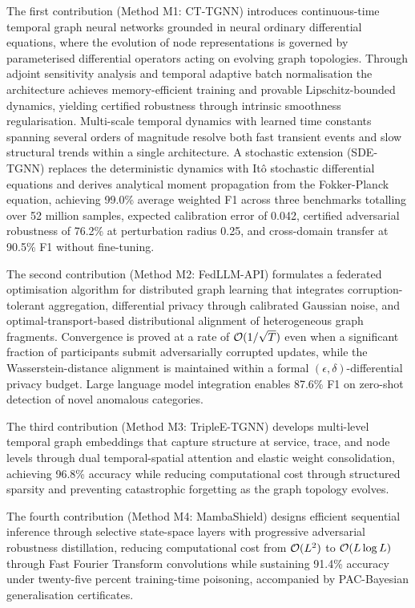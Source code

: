 The first contribution (Method M1: CT-TGNN) introduces continuous-time temporal graph neural networks grounded in neural ordinary differential equations, where the evolution of node representations is governed by parameterised differential operators acting on evolving graph topologies. Through adjoint sensitivity analysis and temporal adaptive batch normalisation the architecture achieves memory-efficient training and provable Lipschitz-bounded dynamics, yielding certified robustness through intrinsic smoothness regularisation. Multi-scale temporal dynamics with learned time constants spanning several orders of magnitude resolve both fast transient events and slow structural trends within a single architecture. A stochastic extension (SDE-TGNN) replaces the deterministic dynamics with It\^{o} stochastic differential equations and derives analytical moment propagation from the Fokker-Planck equation, achieving 99.0\% average weighted F1 across three benchmarks totalling over 52 million samples, expected calibration error of 0.042, certified adversarial robustness of 76.2\% at perturbation radius 0.25, and cross-domain transfer at 90.5\% F1 without fine-tuning.

The second contribution (Method M2: FedLLM-API) formulates a federated optimisation algorithm for distributed graph learning that integrates corruption-tolerant aggregation, differential privacy through calibrated Gaussian noise, and optimal-transport-based distributional alignment of heterogeneous graph fragments. Convergence is proved at a rate of $\mathcal{O}(1/\sqrt{T})$ even when a significant fraction of participants submit adversarially corrupted updates, while the Wasserstein-distance alignment is maintained within a formal $(\epsilon,\delta)$-differential privacy budget. Large language model integration enables 87.6\% F1 on zero-shot detection of novel anomalous categories.

The third contribution (Method M3: TripleE-TGNN) develops multi-level temporal graph embeddings that capture structure at service, trace, and node levels through dual temporal-spatial attention and elastic weight consolidation, achieving 96.8\% accuracy while reducing computational cost through structured sparsity and preventing catastrophic forgetting as the graph topology evolves.

The fourth contribution (Method M4: MambaShield) designs efficient sequential inference through selective state-space layers with progressive adversarial robustness distillation, reducing computational cost from $\mathcal{O}(L^{2})$ to $\mathcal{O}(L\log L)$ through Fast Fourier Transform convolutions while sustaining 91.4\% accuracy under twenty-five percent training-time poisoning, accompanied by PAC-Bayesian generalisation certificates.

